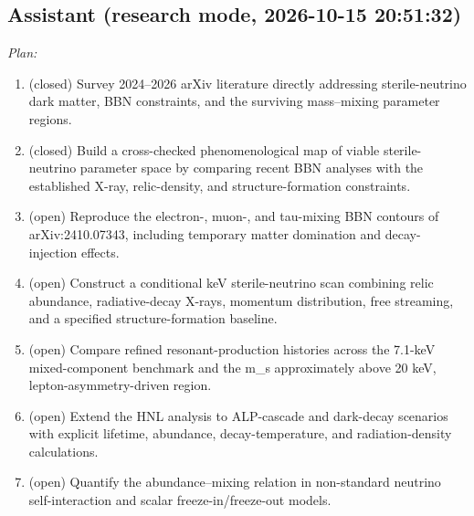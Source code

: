 \documentclass[11pt,a4paper]{article}
\begin{document}
\subsection*{Assistant \small(research mode, 2026-10-15 20:51:32)}
\textit{Plan:}\begin{enumerate}
  \item (closed) Survey 2024--2026 arXiv literature directly addressing sterile-neutrino dark matter, BBN constraints, and the surviving mass--mixing parameter regions.
  \item (closed) Build a cross-checked phenomenological map of viable sterile-neutrino parameter space by comparing recent BBN analyses with the established X-ray, relic-density, and structure-formation constraints.
  \item (open) Reproduce the electron-, muon-, and tau-mixing BBN contours of arXiv:2410.07343, including temporary matter domination and decay-injection effects.
  \item (open) Construct a conditional keV sterile-neutrino scan combining relic abundance, radiative-decay X-rays, momentum distribution, free streaming, and a specified structure-formation baseline.
  \item (open) Compare refined resonant-production histories across the 7.1-keV mixed-component benchmark and the m\_s approximately above 20 keV, lepton-asymmetry-driven region.
  \item (open) Extend the HNL analysis to ALP-cascade and dark-decay scenarios with explicit lifetime, abundance, decay-temperature, and radiation-density calculations.
  \item (open) Quantify the abundance--mixing relation in non-standard neutrino self-interaction and scalar freeze-in/freeze-out models.
\end{enumerate}
\end{document}
